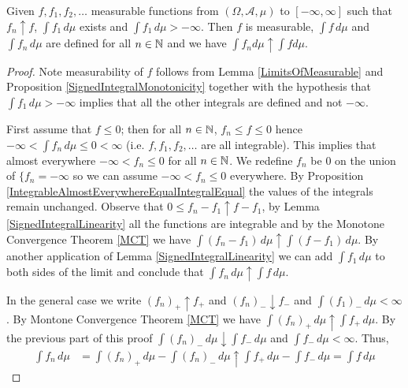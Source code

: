 \begin{thm}\label{SignedMCT}Given $f, f_1,
  f_2, \dots$ measurable functions from
  $(\Omega, \mathcal{A}, \mu)$ to $[-\infty, \infty]$ such that $f_n \uparrow f$, $\int f_1 \, d\mu$ exists and $\int f_1 \, d\mu > -\infty$.  Then $f$ is measurable, $\int f \, d\mu$ and $\int f_n \, d\mu$ are defined for all $n \in \mathbb{N}$
and we  have $\int f_n d \mu \uparrow \int f d \mu$.
\end{thm}
\begin{proof}
Note measurability of $f$ follows from Lemma \ref{LimitsOfMeasurable} and Proposition \ref{SignedIntegralMonotonicity} together with the hypothesis that $\int f_1 \, d\mu > -\infty$ implies that all the other integrals are defined and not $-\infty$.  

First assume that $f \leq 0$; then for all $n \in \mathbb{N}$, $f_n \leq f \leq 0$ hence $-\infty < \int f_n \, d\mu \leq 0 < \infty$ (i.e. $f, f_1, f_2, \dotsc$ are all integrable).  This implies that almost everywhere $-\infty < f_n \leq 0$ for all $n \in \mathbb{N}$.  We redefine $f_n$ be $0$ on the union of $\lbrace f_n = -\infty$ so we can assume $-\infty < f_n \leq 0$ everywhere.  By  Proposition \ref{IntegrableAlmostEverywhereEqualIntegralEqual} the values of the integrals remain unchanged.  Observe that $0 \leq f_n - f_1 \uparrow f - f_1$, by Lemma \ref{SignedIntegralLinearity} all the functions are integrable and by the Monotone Convergence Theorem \ref{MCT} we have $\int (f_n - f_1) \, d\mu \uparrow \int (f - f_1) \, d\mu$.  By another application of Lemma \ref{SignedIntegralLinearity} we can add $\int f_1  \, d\mu$ to both sides of the limit and conclude that $\int f_n \, d\mu \uparrow \int f \, d\mu$.

In the general case we write $(f_n)_+ \uparrow f_+$ and $(f_n)_- \downarrow f_-$ and $\int (f_1)_- \, d\mu < \infty$.  By Montone Convergence Theorem \ref{MCT} we have $\int (f_n)_+ \, d\mu \uparrow \int f_+\, d\mu$.  By the previous part of this proof $\int (f_n)_- \, d\mu \downarrow \int f_- \, d\mu$ and $\int f_- \, d\mu < \infty$.  Thus,
\begin{align*}
\int f_n \, d\mu &= \int (f_n)_+ \, d\mu - \int (f_n)_- \, d\mu \uparrow \int f_+ \, d\mu - \int f_- \, d\mu = \int f \, d\mu
\end{align*}
\end{proof}


